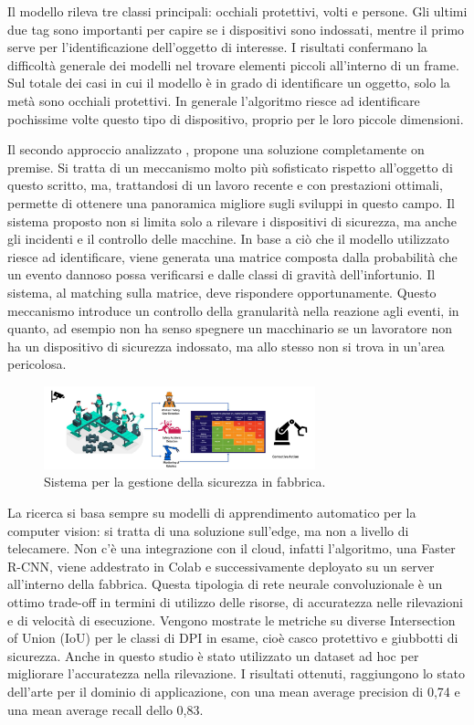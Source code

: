 Il modello rileva tre classi principali: occhiali protettivi, volti e persone. Gli ultimi due tag sono importanti per capire se i dispositivi sono indossati, mentre il primo serve per l'identificazione dell'oggetto di interesse. I risultati confermano la difficoltà generale dei modelli nel trovare elementi piccoli all'interno di un frame. Sul totale dei casi in cui il modello è in grado di identificare un oggetto, solo la metà sono occhiali protettivi. In generale l'algoritmo riesce ad identificare pochissime volte questo tipo di dispositivo, proprio per le loro piccole dimensioni.

Il secondo approccio analizzato \cite{a8safety4}, propone una soluzione completamente on premise. Si tratta di un meccanismo molto più sofisticato rispetto all'oggetto di questo scritto, ma, trattandosi di un lavoro recente e con prestazioni ottimali, permette di ottenere una panoramica migliore sugli sviluppi in questo campo. Il sistema proposto non si limita solo a rilevare i dispositivi di sicurezza, ma anche gli incidenti e il controllo delle macchine. In base a ciò che il modello utilizzato riesce ad identificare, viene generata una matrice composta dalla probabilità che un evento dannoso possa verificarsi e dalle classi di gravità dell'infortunio. Il sistema, al matching sulla matrice, deve rispondere opportunamente. Questo meccanismo introduce un controllo della granularità nella reazione agli eventi, in quanto, ad esempio non ha senso spegnere un macchinario se un lavoratore non ha un dispositivo di sicurezza indossato, ma allo stesso non si trova in un'area pericolosa. 

\begin{figure}[htbp]
    \centering
    \includegraphics[width=0.7\textwidth]{figures/safety-system.png}
    \caption{Sistema per la gestione della sicurezza in fabbrica.}
    \label{fig:safety-system}
\end{figure}

La ricerca si basa sempre su modelli di apprendimento automatico per la computer vision: si tratta di una soluzione sull'edge, ma non a livello di telecamere. Non c'è una integrazione con il cloud, infatti l'algoritmo, una Faster R-CNN, viene addestrato in Colab e successivamente deployato su un server all'interno della fabbrica. Questa tipologia di rete neurale convoluzionale è un ottimo trade-off in termini di utilizzo delle risorse, di accuratezza nelle rilevazioni e di velocità di esecuzione. Vengono mostrate le metriche su diverse Intersection of Union (IoU) per le classi di DPI in esame, cioè casco protettivo e giubbotti di sicurezza. Anche in questo studio è stato utilizzato un dataset ad hoc per migliorare l'accuratezza nella rilevazione. I risultati ottenuti, raggiungono lo stato dell'arte per il dominio di applicazione, con una mean average precision di 0,74 e una mean average recall dello 0,83.

